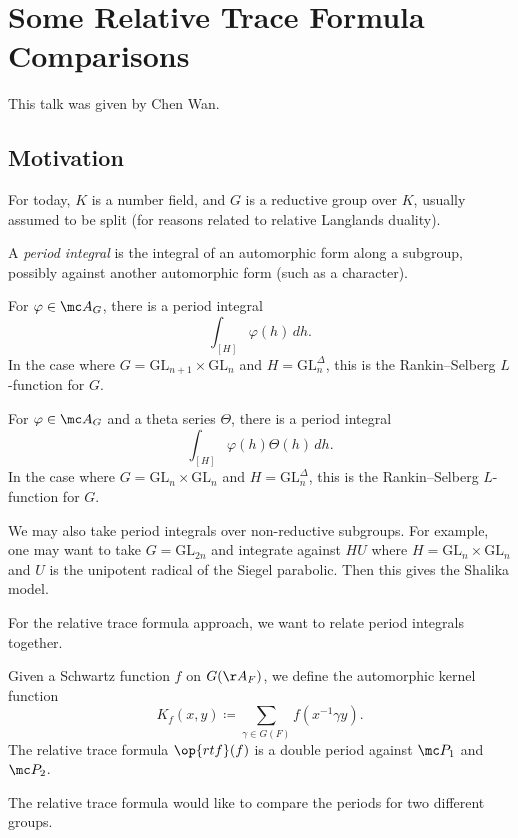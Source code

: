 \documentclass{article}
\begin{document}
\section{Some Relative Trace Formula Comparisons}
This talk was given by Chen Wan.

\subsection{Motivation}
For today, $K$ is a number field, and $G$ is a reductive group over $K$, usually assumed to be split (for reasons related to relative Langlands duality).
\begin{definition}
	A \textit{period integral} is the integral of an automorphic form along a subgroup, possibly against another automorphic form (such as a character).
\end{definition}
\begin{example}
	For $\varphi\in\mc A_G$, there is a period integral
	\[\int_{[H]}\varphi(h)\,dh.\]
	In the case where $G=\mathrm{GL}_{n+1}\times\mathrm{GL}_n$ and $H=\mathrm{GL}_n^\Delta$, this is the Rankin--Selberg $L$-function for $G$.
\end{example}
\begin{example}
	For $\varphi\in\mc A_G$ and a theta series $\Theta$, there is a period integral
	\[\int_{[H]}\varphi(h)\Theta(h)\,dh.\]
	In the case where $G=\mathrm{GL}_n\times\mathrm{GL}_n$ and $H=\mathrm{GL}_n^\Delta$, this is the Rankin--Selberg $L$-function for $G$.
\end{example}
\begin{example}
	We may also take period integrals over non-reductive subgroups. For example, one may want to take $G=\mathrm{GL}_{2n}$ and integrate against $HU$ where $H=\mathrm{GL}_n\times\mathrm{GL}_n$ and $U$ is the unipotent radical of the Siegel parabolic. Then this gives the Shalika model.
\end{example}
For the relative trace formula approach, we want to relate period integrals together.
\begin{notation}
	Given a Schwartz function $f$ on $G(\AA_F)$, we define the automorphic kernel function
	\[K_f(x,y)\coloneqq\sum_{\gamma\in G(F)}f\left(x^{-1}\gamma y\right).\]
	The relative trace formula $\op{rtf}(f)$ is a double period against $\mc P_1$ and $\mc P_2$.
\end{notation}
The relative trace formula would like to compare the periods for two different groups.
\end{document}
